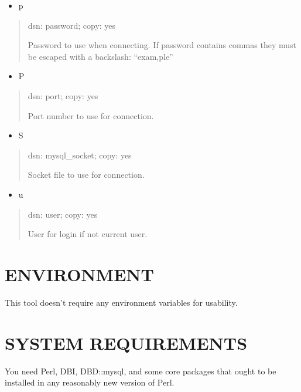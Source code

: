 \documentclass[letterpaper,10pt,english]{sphinxmanual}
\begin{document}
\begin{itemize}
\item {} 
\sphinxAtStartPar
p

\end{itemize}
\begin{quote}

\sphinxAtStartPar
dsn: password; copy: yes

\sphinxAtStartPar
Password to use when connecting.
If password contains commas they must be escaped with a backslash: “exam,ple”
\end{quote}
\begin{itemize}
\item {} 
\sphinxAtStartPar
P

\end{itemize}
\begin{quote}

\sphinxAtStartPar
dsn: port; copy: yes

\sphinxAtStartPar
Port number to use for connection.
\end{quote}
\begin{itemize}
\item {} 
\sphinxAtStartPar
S

\end{itemize}
\begin{quote}

\sphinxAtStartPar
dsn: mysql\_socket; copy: yes

\sphinxAtStartPar
Socket file to use for connection.
\end{quote}
\begin{itemize}
\item {} 
\sphinxAtStartPar
u

\end{itemize}
\begin{quote}

\sphinxAtStartPar
dsn: user; copy: yes

\sphinxAtStartPar
User for login if not current user.
\end{quote}


\section{ENVIRONMENT}
\label{\detokenize{mariadb-config-diff:environment}}
\sphinxAtStartPar
This tool doesn’t require any environment variables for usability.


\section{SYSTEM REQUIREMENTS}
\label{\detokenize{mariadb-config-diff:system-requirements}}
\sphinxAtStartPar
You need Perl, DBI, DBD::mysql, and some core packages that ought to be
installed in any reasonably new version of Perl.
\end{document}
